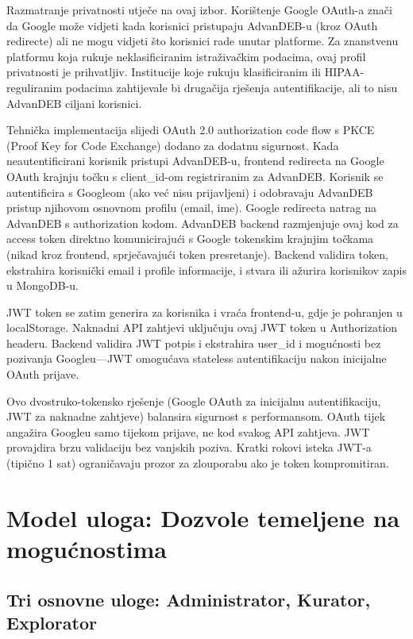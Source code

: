 \documentclass[12pt,a4paper]{article}
\begin{document}
Razmatranje privatnosti utječe na ovaj izbor. Korištenje Google OAuth-a znači da Google može vidjeti kada korisnici pristupaju AdvanDEB-u (kroz OAuth redirecte) ali ne mogu vidjeti što korisnici rade unutar platforme. Za znanstvenu platformu koja rukuje neklasificiranim istraživačkim podacima, ovaj profil privatnosti je prihvatljiv. Institucije koje rukuju klasificiranim ili HIPAA-reguliranim podacima zahtijevale bi drugačija rješenja autentifikacije, ali to nisu AdvanDEB ciljani korisnici.

Tehnička implementacija slijedi OAuth 2.0 authorization code flow s PKCE (Proof Key for Code Exchange) dodano za dodatnu sigurnost. Kada neautentificirani korisnik pristupi AdvanDEB-u, frontend redirecta na Google OAuth krajnju točku s client\_id-om registriranim za AdvanDEB. Korisnik se autentificira s Googleom (ako već nisu prijavljeni) i odobravaju AdvanDEB pristup njihovom osnovnom profilu (email, ime). Google redirecta natrag na AdvanDEB s authorization kodom. AdvanDEB backend razmjenjuje ovaj kod za access token direktno komunicirajući s Google tokenskim krajnjim točkama (nikad kroz frontend, sprječavajući token presretanje). Backend validira token, ekstrahira korisnički email i profile informacije, i stvara ili ažurira korisnikov zapis u MongoDB-u.

JWT token se zatim generira za korisnika i vraća frontend-u, gdje je pohranjen u localStorage. Naknadni API zahtjevi uključuju ovaj JWT token u Authorization headeru. Backend validira JWT potpis i ekstrahira user\_id i mogućnosti bez pozivanja Googleu—JWT omogućava stateless autentifikaciju nakon inicijalne OAuth prijave.

Ovo dvostruko-tokensko rješenje (Google OAuth za inicijalnu autentifikaciju, JWT za naknadne zahtjeve) balansira sigurnost s performansom. OAuth tijek angažira Googleu samo tijekom prijave, ne kod svakog API zahtjeva. JWT provajdira brzu validaciju bez vanjskih poziva. Kratki rokovi isteka JWT-a (tipično 1 sat) ograničavaju prozor za zlouporabu ako je token kompromitiran.

\section{Model uloga: Dozvole temeljene na mogućnostima}

\subsection{Tri osnovne uloge: Administrator, Kurator, Explorator}
\end{document}
